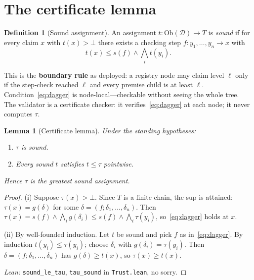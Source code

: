 \documentclass[11pt,a4paper]{article}
\theoremstyle{plain}
\newtheorem{lemma}[theorem]{Lemma}
\theoremstyle{definition}
\newtheorem{definition}[theorem]{Definition}
\begin{document}
\section{The certificate lemma}
\label{sec:certificate}

\begin{definition}[Sound assignment]
\label{def:sound}
An assignment $t : \mathrm{Ob}({\mathcal D}) \to T$ is \emph{sound} if
for every claim $x$ with $t(x) > \bot$ there exists a checking step
$f : y_1, \ldots, y_n \to x$ with
\begin{equation}
\label{eq:dagger}
t(x) \leq s(f) \wedge \bigwedge_i t(y_i). \tag{$\dagger$}
\end{equation}
\end{definition}

This is the \textbf{boundary rule} as deployed: a registry node may
claim level $\ell$ only if the step-check reached $\ell$ and every
premise child is at least $\ell$. Condition~\eqref{eq:dagger} is
node-local---checkable without seeing the whole tree. The validator is a
certificate checker: it verifies~\eqref{eq:dagger} at each node; it
never computes $\tau$.

\begin{lemma}[Certificate lemma]
\label{lem:certificate}
Under the standing hypotheses:
\begin{enumerate}[label=(\roman*)]
\item $\tau$ is sound.
\item Every sound $t$ satisfies $t \leq \tau$ pointwise.
\end{enumerate}
Hence $\tau$ is the greatest sound assignment.
\end{lemma}

\begin{proof}
(i) Suppose $\tau(x) > \bot$. Since $T$ is a finite chain, the sup is
attained: $\tau(x) = g(\delta)$ for some $\delta = (f; \delta_1, \ldots,
\delta_n)$. Then $\tau(x) = s(f) \wedge \bigwedge_i g(\delta_i) \leq
s(f) \wedge \bigwedge_i \tau(y_i)$, so~\eqref{eq:dagger} holds at $x$.

(ii) By well-founded induction. Let $t$ be sound and pick $f$ as
in~\eqref{eq:dagger}. By induction $t(y_i) \leq \tau(y_i)$; choose
$\delta_i$ with $g(\delta_i) = \tau(y_i)$. Then $\delta = (f; \delta_1,
\ldots, \delta_n)$ has $g(\delta) \geq t(x)$, so $\tau(x) \geq t(x)$.

\emph{Lean:} \texttt{sound\_le\_tau}, \texttt{tau\_sound} in
\texttt{Trust.lean}, no sorry.
\end{proof}
\end{document}
